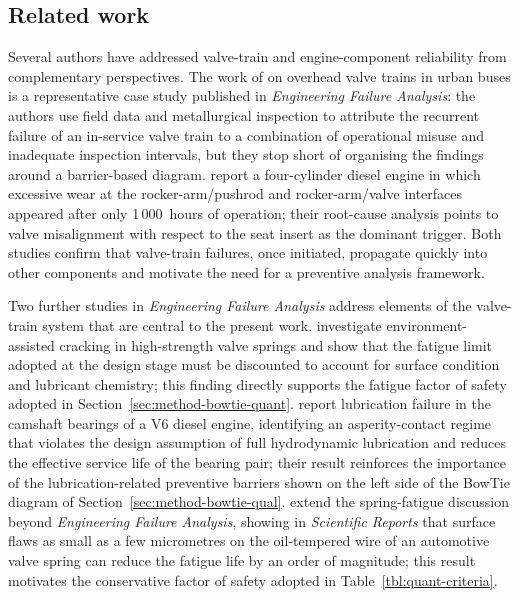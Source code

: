 \subsection{Related work}\label{sec:bg-related}

Several authors have addressed valve-train and engine-component
reliability from complementary perspectives. The work of
\citet{velezgodino2019overheadvalvetrain} on overhead valve trains in
urban buses is a representative case study published in
\textit{Engineering Failure Analysis}: the authors use field data and
metallurgical inspection to attribute the recurrent failure of an
in-service valve train to a combination of operational misuse and
inadequate inspection intervals, but they stop short of organising the
findings around a barrier-based diagram. \citet{soffritti2018wornvalvetrain}
report a four-cylinder diesel engine in which excessive wear at the
rocker-arm/pushrod and rocker-arm/valve interfaces appeared after only
1\,000~hours of operation; their root-cause analysis points to valve
misalignment with respect to the seat insert as the dominant trigger.
Both studies confirm that valve-train failures, once initiated,
propagate quickly into other components and motivate the need for a
preventive analysis framework.

Two further studies in \textit{Engineering Failure Analysis} address
elements of the valve-train system that are central to the present
work. \citet{xing2021valvespringEAC} investigate environment-assisted
cracking in high-strength valve springs and show that the fatigue limit
adopted at the design stage must be discounted to account for surface
condition and lubricant chemistry; this finding directly supports the
fatigue factor of safety adopted in
Section~\ref{sec:method-bowtie-quant}.
\citet{zhao2023camshaftV6} report lubrication failure in the camshaft
bearings of a V6 diesel engine, identifying an asperity-contact regime
that violates the design assumption of full hydrodynamic lubrication
and reduces the effective service life of the bearing pair; their
result reinforces the importance of the lubrication-related preventive
barriers shown on the left side of the BowTie diagram of
Section~\ref{sec:method-bowtie-qual}.
\citet{ko2022springfatigueflaws} extend the spring-fatigue discussion
beyond \textit{Engineering Failure Analysis}, showing in
\textit{Scientific Reports} that surface flaws as small as a few
micrometres on the oil-tempered wire of an automotive valve spring can
reduce the fatigue life by an order of magnitude; this result motivates
the conservative factor of safety adopted in
Table~\ref{tbl:quant-criteria}.


